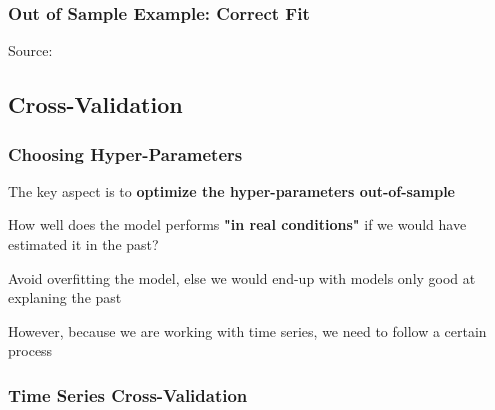\documentclass{beamer}
\newenvironment{wideitemize}{\itemize\addtolength{\itemsep}{10pt}}{\enditemize}
\begin{document}
\begin{frame}
  \frametitle{Out of Sample Example: Correct Fit}
  \hspace*{15pt}\hbox{\scriptsize Source:}
\end{frame}


\subsection{Cross-Validation}


\begin{frame}
  \frametitle{Choosing Hyper-Parameters}
  \begin{wideitemize}
    \item The key aspect is to \textbf{optimize the hyper-parameters out-of-sample} 
    \item How well does the model performs \textbf{"in real conditions"} if we would have estimated it in the past?
    \item Avoid overfitting the model, else we would end-up with models only good at explaning the past
    \item However, because we are working with time series, we need to follow a certain process
  \end{wideitemize}
\end{frame}

\begin{frame}
  \frametitle{Time Series Cross-Validation}
  \end{frame}
\end{document}
